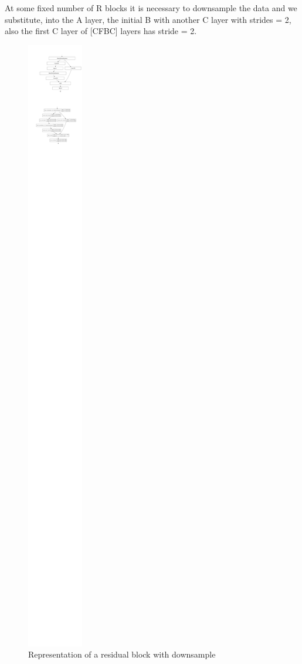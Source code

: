 \documentclass[10pt,twocolumn,letterpaper]{article}
\begin{document}
At some fixed number of R blocks it is necessary to downsample the data and we substitute, into the A layer, the initial B with another C layer with strides = 2, also the first C layer of [CFBC] layers has stride = 2.
\begin{figure}[H]
   \centering
   \includegraphics[width=0.6\linewidth]{./immagini/residual_block_with_downsample.pdf}
   \caption{Representation of a residual block with downsample}
\end{figure}
\def\arraystretch{1.2}
\end{document}
